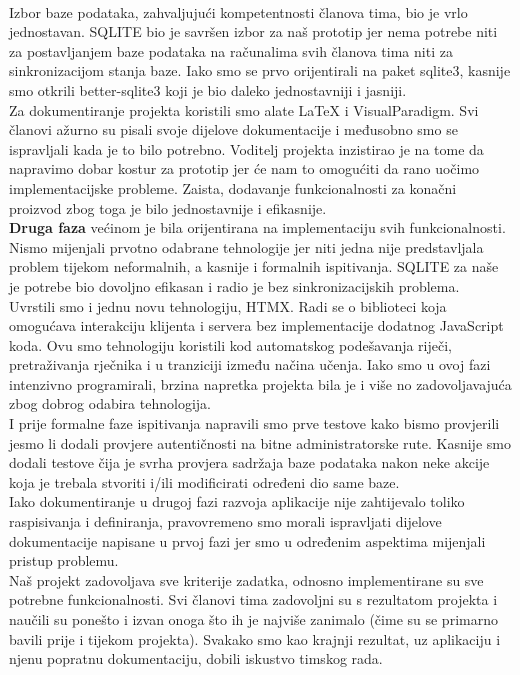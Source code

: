 		\newline
		\\
		Izbor baze podataka, zahvaljujući kompetentnosti članova tima, bio je vrlo jednostavan. SQLITE bio je savršen izbor za naš prototip jer nema potrebe niti za postavljanjem baze podataka na računalima svih članova tima niti za sinkronizacijom stanja baze. Iako smo se prvo orijentirali na paket sqlite3, kasnije smo otkrili better-sqlite3 koji je bio daleko jednostavniji i jasniji.
		\newline
		\\
		 Za dokumentiranje projekta koristili smo alate LaTeX i VisualParadigm. Svi članovi ažurno su pisali svoje dijelove dokumentacije i međusobno smo se ispravljali kada je to bilo potrebno. Voditelj projekta inzistirao je na tome da napravimo dobar kostur za prototip jer će nam to omogućiti da rano uočimo implementacijske probleme. Zaista, dodavanje funkcionalnosti za konačni proizvod zbog toga je bilo jednostavnije i efikasnije.
		 \newline
		\\
		\textbf{Druga faza} većinom je bila orijentirana na implementaciju svih funkcionalnosti. Nismo mijenjali prvotno odabrane tehnologije jer niti jedna nije predstavljala problem tijekom neformalnih, a kasnije i formalnih ispitivanja. SQLITE za naše je potrebe bio dovoljno efikasan i radio je bez sinkronizacijskih problema. 
		\newline
		\\
		Uvrstili smo i jednu novu tehnologiju, HTMX. Radi se o biblioteci koja omogućava interakciju klijenta i servera bez implementacije dodatnog JavaScript koda. Ovu smo tehnologiju koristili kod automatskog podešavanja riječi, pretraživanja rječnika i u tranziciji između načina učenja. Iako smo u ovoj fazi intenzivno programirali, brzina napretka projekta bila je i više no zadovoljavajuća zbog dobrog odabira tehnologija.
		\newline
		\\
		I prije formalne faze ispitivanja napravili smo prve testove kako bismo provjerili jesmo li dodali provjere autentičnosti na bitne administratorske rute. Kasnije smo dodali testove čija je svrha provjera sadržaja baze podataka nakon neke akcije koja je trebala stvoriti i/ili modificirati određeni dio same baze. 
		\newline
		\\
		Iako dokumentiranje u drugoj fazi razvoja aplikacije nije zahtijevalo toliko raspisivanja i definiranja, pravovremeno smo morali ispravljati dijelove dokumentacije napisane u prvoj fazi jer smo u određenim aspektima mijenjali pristup problemu.
		\newline
		\\
	   \indent 
	   Naš projekt zadovoljava sve kriterije zadatka, odnosno implementirane su sve potrebne funkcionalnosti. Svi članovi tima zadovoljni su s rezultatom projekta i naučili su ponešto i izvan onoga što ih je najviše zanimalo (čime su se primarno bavili prije i tijekom projekta). Svakako smo kao krajnji rezultat, uz aplikaciju i njenu popratnu dokumentaciju, dobili iskustvo timskog rada.
		 \eject 